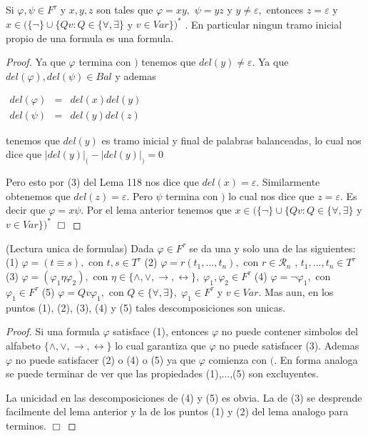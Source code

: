   \begin{proposition}
    Si \(\varphi ,\psi \in F^{\tau }\) y \( x,y,z\) son tales que \(\varphi =xy,\) \(\psi =yz\) y \(y\neq \varepsilon ,\) entonces \(z=\varepsilon \) y \( x\in (\{\lnot \}\cup \{Qv:Q\in \{\forall ,\exists \}\) y \(v\in Var\})^{\ast }\) . En particular ningun tramo inicial propio de una formula es una formula.
  \end{proposition}
  \begin{proof}
    Ya que \(\varphi \) termina con \()\) tenemos que \(del(y)\neq \varepsilon .\) Ya que \(del(\varphi ),del(\psi )\in Bal\) y ademas

    \(\displaystyle \begin{array}{rcl} del(\varphi ) & =& del(x)del(y) \\ del(\psi ) & =& del(y)del(z) \end{array} \)

    tenemos que \(del(y)\) es tramo inicial y final de palabras balanceadas, lo cual nos dice que
    \(\displaystyle \left\vert del(y)\right\vert _{(}-\left\vert del(y)\right\vert _{)}=0 \)

    Pero esto por (3) del Lema 118 nos dice que \( del(x)=\varepsilon \). Similarmente obtenemos que \(del(z)=\varepsilon \). Pero \(\psi \) termina con \()\) lo cual nos dice que \(z=\varepsilon \). Es decir que \( \varphi =x\psi \). Por el lema anterior tenemos que \(x\in (\{\lnot \}\cup \{Qv:Q\in \{\forall ,\exists \}\) y \(v\in Var\})^{\ast }\) \(\Box\)
  \end{proof}

  \begin{theorem}
    (Lectura unica de formulas) Dada \(\varphi \in F^{\tau }\) se da una y solo una de las siguientes:
    (1) \(\varphi =(t\equiv s),\) con \(t,s\in T^{\tau }\)
    (2) \(\varphi =r(t_{1},...,t_{n}),\) con \(r\in \mathcal{R}_{n}\) , \(t_{1},...,t_{n}\in T^{\tau }\)
    (3) \(\varphi =(\varphi _{1}\eta \varphi _{2}),\) con \(\eta \in \{\wedge ,\vee ,\rightarrow ,\leftrightarrow \},\;\varphi _{1},\varphi _{2}\in F^{\tau }\)
    (4) \(\varphi =\lnot \varphi _{1},\) con \(\varphi _{1}\in F^{\tau }\)
    (5) \(\varphi =Qv\varphi _{1},\) con \(Q\in \{\forall ,\exists \},\;\varphi _{1}\in F^{\tau }\) y \(v\in Var.\)
    Mas aun, en los puntos (1), (2), (3), (4) y (5) tales descomposiciones son unicas.
  \end{theorem}
  \begin{proof}
    Si una formula \(\varphi \) satisface (1), entonces \(\varphi \) no puede contener simbolos del alfabeto \(\{\wedge ,\vee ,\rightarrow ,\leftrightarrow \}\) lo cual garantiza que \(\varphi \) no puede satisfacer (3). Ademas \( \varphi \) no puede satisfacer (2) o (4) o (5) ya que \(\varphi \) comienza con \((\). En forma analoga se puede terminar de ver que las propiedades (1),...,(5) son excluyentes.

    La unicidad en las descomposiciones de (4) y (5) es obvia. La de (3) se desprende facilmente del lema anterior y la de los puntos (1) y (2) del lema analogo para terminos. \(\Box\)
  \end{proof}

